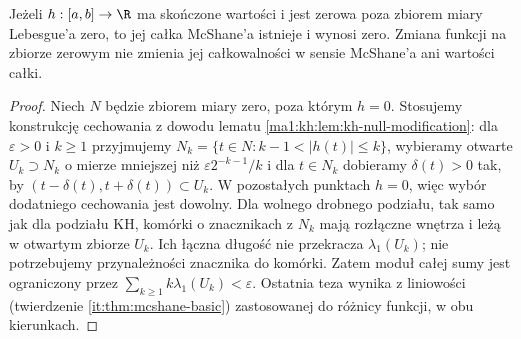 \begin{wniosek}
\label{ma1:kh:cor:mcshane-null-modification}
Jeżeli $h:[a,b]\to\R$ ma skończone wartości i jest zerowa
poza zbiorem miary Lebesgue'a zero, to jej całka McShane'a
istnieje i wynosi zero. Zmiana funkcji na zbiorze zerowym
nie zmienia jej całkowalności w sensie McShane'a ani wartości całki.
\end{wniosek}
\begin{proof}
Niech $N$ będzie zbiorem miary zero, poza którym $h=0$.
Stosujemy konstrukcję cechowania z dowodu lematu
\ref{ma1:kh:lem:kh-null-modification}: dla $\varepsilon>0$
i $k\ge1$ przyjmujemy $N_k=\{t\in N:k-1<|h(t)|\le k\}$,
wybieramy otwarte $U_k\supset N_k$ o mierze
mniejszej niż $\varepsilon 2^{-k-1}/k$ i dla $t\in N_k$
dobieramy $\delta(t)>0$ tak, by
$(t-\delta(t),t+\delta(t))\subset U_k$.
W pozostałych punktach $h=0$, więc wybór dodatniego
cechowania jest dowolny.
Dla wolnego drobnego podziału, tak samo jak dla podziału KH,
komórki o znacznikach z $N_k$ mają rozłączne wnętrza
i leżą w otwartym zbiorze $U_k$.
Ich łączna długość nie przekracza $\lambda_1(U_k)$;
nie potrzebujemy przynależności znacznika do komórki.
Zatem moduł całej sumy jest ograniczony przez
$\sum_{k\ge1} k\lambda_1(U_k)<\varepsilon$.
Ostatnia teza wynika z liniowości
(twierdzenie \ref{it:thm:mcshane-basic}) zastosowanej do różnicy funkcji,
w obu kierunkach.
\end{proof}

